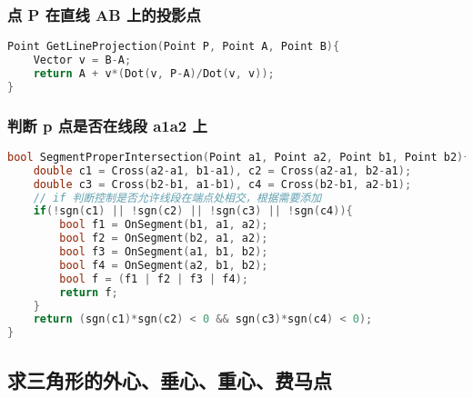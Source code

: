 \subsubsection{点 P 在直线 AB 上的投影点}

\begin{lstlisting}[language=C++]
Point GetLineProjection(Point P, Point A, Point B){
    Vector v = B-A;
    return A + v*(Dot(v, P-A)/Dot(v, v));
}
\end{lstlisting}

\subsubsection{判断 p 点是否在线段 a1a2 上}

\begin{lstlisting}[language=C++]
bool SegmentProperIntersection(Point a1, Point a2, Point b1, Point b2){
    double c1 = Cross(a2-a1, b1-a1), c2 = Cross(a2-a1, b2-a1);
    double c3 = Cross(b2-b1, a1-b1), c4 = Cross(b2-b1, a2-b1);
    // if 判断控制是否允许线段在端点处相交，根据需要添加
    if(!sgn(c1) || !sgn(c2) || !sgn(c3) || !sgn(c4)){
        bool f1 = OnSegment(b1, a1, a2);
        bool f2 = OnSegment(b2, a1, a2);
        bool f3 = OnSegment(a1, b1, b2);
        bool f4 = OnSegment(a2, b1, b2);
        bool f = (f1 | f2 | f3 | f4);
        return f;
    }
    return (sgn(c1)*sgn(c2) < 0 && sgn(c3)*sgn(c4) < 0);
}
\end{lstlisting}

\subsection{求三角形的外心、垂心、重心、费马点}

